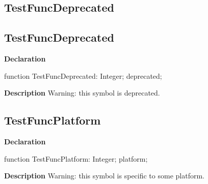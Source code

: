 \documentclass{report}
\newif\ifpdf
\begin{document}
\subsection*{\large{\textbf{TestFuncDeprecated}}\normalsize\hspace{1ex}\hrulefill}
\else
\subsection*{TestFuncDeprecated}
\fi
\label{ok_hint_directives-TestFuncDeprecated}
\begin{list}{}{
\setlength{\itemindent}{0cm}
\setlength{\listparindent}{0cm}
\setlength{\leftmargin}{\evensidemargin}
\addtolength{\leftmargin}{\tmplength}
\settowidth{\labelsep}{X}
\addtolength{\leftmargin}{\labelsep}
\setlength{\labelwidth}{\tmplength}
}
\item[\textbf{Declaration}\hfill]
\ifpdf
\begin{flushleft}
\fi
\begin{ttfamily}
function TestFuncDeprecated: Integer; deprecated;\end{ttfamily}

\ifpdf
\end{flushleft}
\fi

\par
\item[\textbf{Description}]
Warning: this symbol is deprecated.

 

\end{list}
\ifpdf
\subsection*{\large{\textbf{TestFuncPlatform}}\normalsize\hspace{1ex}\hrulefill}
\else
\subsection*{TestFuncPlatform}
\fi
\label{ok_hint_directives-TestFuncPlatform}
\begin{list}{}{
\setlength{\itemindent}{0cm}
\setlength{\listparindent}{0cm}
\setlength{\leftmargin}{\evensidemargin}
\addtolength{\leftmargin}{\tmplength}
\settowidth{\labelsep}{X}
\addtolength{\leftmargin}{\labelsep}
\setlength{\labelwidth}{\tmplength}
}
\item[\textbf{Declaration}\hfill]
\ifpdf
\begin{flushleft}
\fi
\begin{ttfamily}
function TestFuncPlatform: Integer; platform;\end{ttfamily}

\ifpdf
\end{flushleft}
\fi

\par
\item[\textbf{Description}]
Warning: this symbol is specific to some platform.

 

\end{list}
\ifpdf
\end{document}
